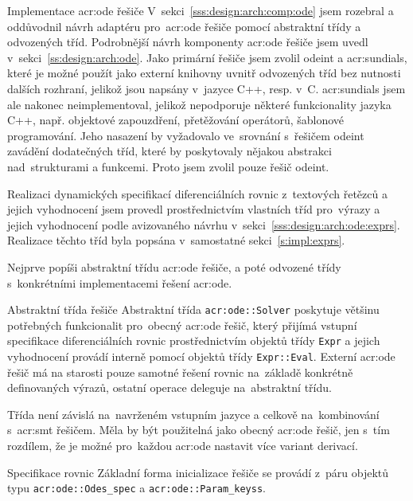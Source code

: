 \documentclass[thesis=M,czech]{FITthesis}[2012/06/26]
\newcommand{\acrlabel}[1]{acr:#1}
\newcommand{\acr}[1]{\acrshort{\acrlabel{#1}}}
\newcommand{\id}[1]{\texttt{#1}}
\newcommand{\rf}[1]{\ref{#1}}
\begin{document}
\begin{section}{Implementace \acr{ode} řešiče}\label{s:impl:ode}
V~sekci~\rf{sss:design:arch:comp:ode} jsem rozebral
a oddůvodnil návrh adaptéru pro~\acr{ode} řešiče
pomocí abstraktní třídy a odvozených tříd.
Podrobnější návrh komponenty \acr{ode} řešiče
jsem uvedl v~sekci~\rf{ss:design:arch:ode}.
Jako primární řešiče jsem zvolil odeint a \acr{sundials},
které je možné použít jako externí knihovny
uvnitř odvozených tříd bez nutnosti dalších rozhraní,
jelikož jsou napsány v~jazyce C++, resp. v~C.
\acr{sundials} jsem ale nakonec neimplementoval,
jelikož nepodporuje některé funkcionality jazyka C++,
např. objektové zapouzdření,
přetěžování operátorů, šablonové programování.
Jeho nasazení by vyžadovalo ve~srovnání s~řešičem odeint
zavádění dodatečných tříd,
které by poskytovaly nějakou abstrakci nad~strukturami a funkcemi.
Proto jsem zvolil pouze řešič odeint.

Realizaci dynamických specifikací diferenciálních rovnic
z~textových řetězců a jejich vyhodnocení
jsem provedl prostřednictvím
vlastních tříd pro~výrazy a jejich vyhodnocení
podle avizovaného návrhu v~sekci~\rf{sss:design:arch:ode:exprs}.
Realizace těchto tříd byla popsána v~samostatné sekci~\rf{s:impl:exprs}.

Nejprve popíši abstraktní třídu \acr{ode} řešiče,
a poté odvozené třídy s~konkrétními implementacemi řešení \acr{ode}.


\begin{subsection}{Abstraktní třída řešiče}
\label{ss:impl:ode:solver}
Abstraktní třída \id{\acr{ode}::\-Solver}
poskytuje většinu potřebných funkcionalit
pro~obecný \acr{ode} řešič,
který přijímá vstupní specifikace diferenciálních
rovnic prostřednictvím objektů třídy \id{Expr}
a jejich vyhodnocení provádí interně
pomocí objektů třídy \id{Expr::\-Eval}.
Externí \acr{ode} řešič má na starosti
pouze samotné řešení rovnic na~základě
konkrétně definovaných výrazů,
ostatní operace deleguje na~abstraktní třídu.

Třída není závislá na~navrženém vstupním jazyce
a celkově na~kombinování s~\acr{smt} řešičem.
Měla by být použitelná jako obecný \acr{ode} řešič,
jen s~tím rozdílem, že je možné pro~každou \acr{ode}
nastavit více variant derivací.


\begin{subsubsection}{Specifikace rovnic}\label{sss:impl:ode:solver:spec}
Základní forma inicializace řešiče se provádí
z~páru objektů typu \id{\acr{ode}::\-Odes\_\-spec}
a \id{\acr{ode}::\-Param\_\-keyss}.


\end{subsubsection}
\end{subsection}
\end{section}
\end{document}
